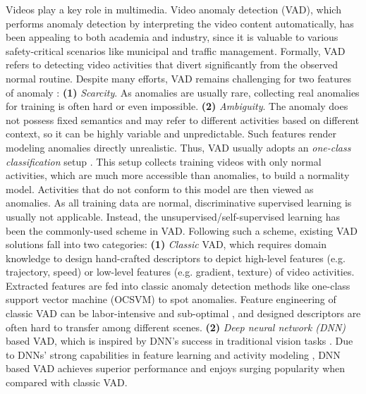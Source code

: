 \documentclass[sigconf]{acmart}
\begin{document}
Videos play a key role in multimedia. Video anomaly detection (VAD), which performs anomaly detection by interpreting the video content automatically, has been appealing to both academia and industry, since it is valuable to various safety-critical scenarios like municipal and traffic management. Formally, VAD refers to detecting video activities that divert significantly from the observed normal routine. Despite many efforts, VAD remains challenging for two features of anomaly \cite{chandola2009anomaly}: \textbf{(1)} \textit{Scarcity}. As anomalies are usually rare, collecting real anomalies for training is often hard or even impossible. \textbf{(2)} \textit{Ambiguity}. The anomaly does not possess fixed semantics and may refer to different activities based on different context, so it can be highly variable and unpredictable. Such features render modeling anomalies directly unrealistic. Thus, VAD usually adopts an \textit{one-class classification} setup \cite{khan2014one}. This setup collects training videos with only normal activities, which are much more accessible than anomalies, to build a normality model. Activities that do not conform to this model are then viewed as anomalies. As all training data are normal, discriminative supervised learning is usually not applicable. Instead, the unsupervised/self-supervised learning has been the commonly-used scheme in VAD. Following such a scheme, existing VAD solutions fall into two categories: \textbf{(1)} \textit{Classic} VAD, which requires domain knowledge to design hand-crafted descriptors to depict high-level features (e.g. trajectory, speed) or low-level features (e.g. gradient, texture) of video activities. Extracted features are fed into classic anomaly detection methods like one-class support vector machine (OCSVM) to spot anomalies. Feature engineering of classic VAD can be labor-intensive and sub-optimal \cite{xu2017detecting}, and designed descriptors are often hard to transfer among different scenes. \textbf{(2)} \textit{Deep neural network (DNN)} based VAD, which is inspired by DNN's success in traditional vision tasks \cite{lecun2015deep}. Due to DNNs' strong capabilities in feature learning and activity modeling \cite{hasan2016learning}, DNN based VAD achieves superior performance and enjoys surging popularity when compared with classic VAD.
\end{document}
